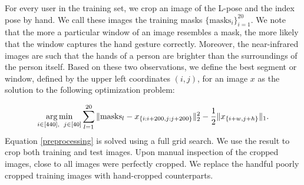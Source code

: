For every user in the training set, we crop an image of the L-pose and the index pose by hand. We call these images the training masks $\{\text{masks}_i \}_{i=1}^{20}$. We note that the more a particular window of an image resembles a mask, the more likely that the window captures the hand gesture correctly. Moreover, the near-infrared images are such that the hands of a person are brighter than the surroundings of the person itself. Based on these two observations, we define the best segment or window, defined by the upper left coordinates $(i,j)$, for an image $x$ as the solution to the following optimization problem:

\begin{equation}
\label{preprocessing}
    \operatorname*{arg\,min}_{i \in [440], \hspace{0.5em} j \in [40]} \sum_{l=1}^{20}\|\text{masks}_l-x_{\{i:i+200,j:j+200\}}\|^2_2 - \frac{1}{2}\|x_{\{i+w,j+h\}}\|_1.
\end{equation}
Equation \ref{preprocessing} is solved using a full grid search. We use the result to crop both training and test images. Upon manual inspection of the cropped images, close to all images were perfectly cropped. We replace the handful poorly cropped training images with hand-cropped counterparts.

